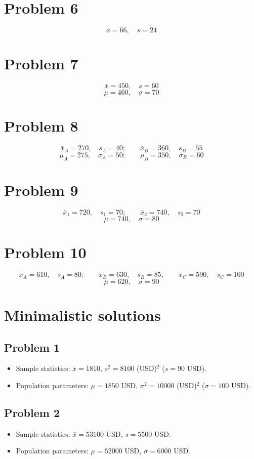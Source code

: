 \section*{Problem 6}
\[
\bar{x} = 66,\quad s = 24
\]

\section*{Problem 7}
\[
\bar{x} = 450,\quad s = 60
\]
\[
\mu = 460,\quad \sigma = 70
\]

\section*{Problem 8}
\[
\bar{x}_{A} = 270,\quad s_{A} = 40;\qquad \bar{x}_{B} = 360,\quad s_{B} = 55
\]
\[
\mu_{A} = 275,\quad \sigma_{A} = 50;\qquad \mu_{B} = 350,\quad \sigma_{B} = 60
\]

\section*{Problem 9}
\[
\bar{x}_{1} = 720,\quad s_{1} = 70;\qquad \bar{x}_{2} = 740,\quad s_{2} = 70
\]
\[
\mu = 740,\quad \sigma = 80
\]

\section*{Problem 10}
\[
\bar{x}_{A} = 610,\quad s_{A} = 80;\qquad \bar{x}_{B} = 630,\quad s_{B} = 85;\qquad \bar{x}_{C} = 590,\quad s_{C} = 100
\]
\[
\mu = 620,\quad \sigma = 90
\]


\section*{Minimalistic solutions}
\subsection*{Problem 1}
\begin{itemize}
    \item Sample statistics: $\bar{x}=1810$, $s^2=8100$ (USD)$^2$ ($s=90$ USD).
    \item Population parameters: $\mu=1850$ USD, $\sigma^2=10000$ (USD)$^2$ ($\sigma=100$ USD).
\end{itemize}

\subsection*{Problem 2}
\begin{itemize}
    \item Sample statistics: $\bar{x}=53100$ USD, $s=5500$ USD.
    \item Population parameters: $\mu=52000$ USD, $\sigma=6000$ USD.
\end{itemize}

